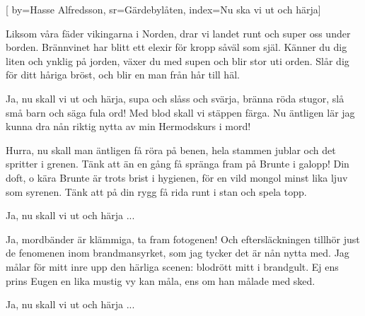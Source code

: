 [ 	
    by={Hasse Alfredsson},						
	sr={Gärdebylåten},					
	index={Nu ska vi ut och härja}]		

\beginverse*
Liksom våra fäder vikingarna i Norden,
drar vi landet runt och super oss under borden.
Brännvinet har blitt ett elexir 
för kropp såväl som själ.
Känner du dig liten och ynklig på jorden,
växer du med supen och blir stor uti orden.
Slår dig för ditt håriga bröst,
och blir en man från hår till häl.
\endverse

\beginchorus				
Ja, nu skall vi ut och härja,
supa och slåss och svärja,
bränna röda stugor, slå små barn
 och säga fula ord!
Med blod skall vi stäppen färga.
Nu äntligen lär jag
kunna dra nån riktig nytta av min Hermodskurs i mord! 
\endchorus	

\beginverse					
Hurra, nu skall man äntligen få röra på benen,
hela stammen jublar och det spritter i grenen.
Tänk att än en gång få spränga fram
 på Brunte i galopp!
Din doft, o kära Brunte är trots brist i hygienen,
för en vild mongol minst lika ljuv som syrenen.
Tänk att på din rygg få rida runt
 i stan och spela topp. 
\endverse						

\beginchorus				
Ja, nu skall vi ut och härja ...
\endchorus	

\beginverse
Ja, mordbänder är klämmiga, ta fram fotogenen!
Och eftersläckningen tillhör just de fenomenen
inom brandmansyrket, som jag tycker det är nån nytta med.
Jag målar för mitt inre upp den härliga scenen: 
blodrött mitt i brandgult. Ej ens prins Eugen en
lika mustig vy kan måla, ens om han målade med sked. 
\endverse	

\beginchorus	
Ja, nu skall vi ut och härja ... 
\endchorus	
\endsong		
